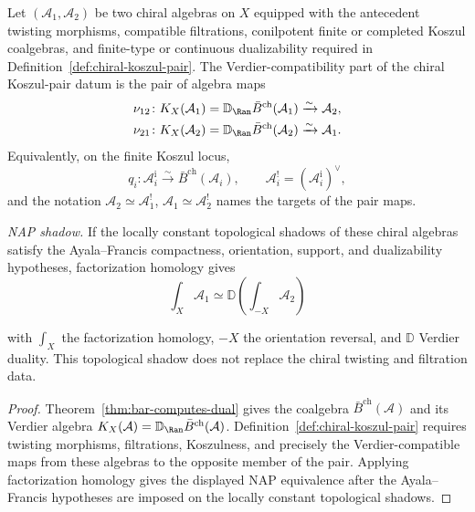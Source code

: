 \begin{proposition}\label{prop:koszul-pair-NAP}
Let $(\mathcal{A}_1,\mathcal{A}_2)$ be two chiral algebras on $X$
equipped with the antecedent twisting morphisms, compatible
filtrations, conilpotent finite or completed Koszul coalgebras, and
finite-type or continuous dualizability required in
Definition~\ref{def:chiral-koszul-pair}. The Verdier-compatibility
part of the chiral Koszul-pair datum is the pair of algebra maps
\begin{align}
\nu_{12}\colon K_X(\mathcal A_1)
=\mathbb{D}_{\Ran}\bar{B}^{\mathrm{ch}}(\mathcal{A}_1)
&\xrightarrow{\sim} \mathcal{A}_2,\\
\nu_{21}\colon K_X(\mathcal A_2)
=\mathbb{D}_{\Ran}\bar{B}^{\mathrm{ch}}(\mathcal{A}_2)
&\xrightarrow{\sim} \mathcal{A}_1.
\end{align}
Equivalently, on the finite Koszul locus,
\[
q_i\colon\mathcal{A}_i^{\mathrm i}
\xrightarrow{\sim}\bar{B}^{\mathrm{ch}}(\mathcal{A}_i),
\qquad
\mathcal{A}_i^!=(\mathcal{A}_i^{\mathrm i})^\vee,
\]
and the notation $\mathcal{A}_2\simeq\mathcal{A}_1^!$,
$\mathcal{A}_1\simeq\mathcal{A}_2^!$ names the targets of the pair
maps.

\emph{NAP shadow.}
If the locally constant topological shadows of these chiral
algebras satisfy the Ayala--Francis compactness, orientation,
support, and dualizability hypotheses, factorization homology gives
\[\int_X \mathcal{A}_1 \simeq \mathbb{D}\left(\int_{-X} \mathcal{A}_2\right)\]

with $\int_X$ the factorization homology, $-X$ the orientation
reversal, and $\mathbb{D}$ Verdier duality. This topological shadow
does not replace the chiral twisting and filtration data.
\end{proposition}

\begin{proof}
Theorem~\ref{thm:bar-computes-dual} gives the coalgebra
$\bar{B}^{\mathrm{ch}}(\mathcal{A})$ and its Verdier algebra
$K_X(\mathcal A)=\mathbb{D}_{\Ran}\bar{B}^{\mathrm{ch}}(\mathcal{A})$.
Definition~\ref{def:chiral-koszul-pair}
requires twisting morphisms, filtrations, Koszulness, and precisely
the Verdier-compatible maps from these algebras to the opposite
member of the pair. Applying factorization homology gives the
displayed NAP equivalence after the
Ayala--Francis hypotheses are imposed on the locally constant
topological shadows.
\end{proof}

